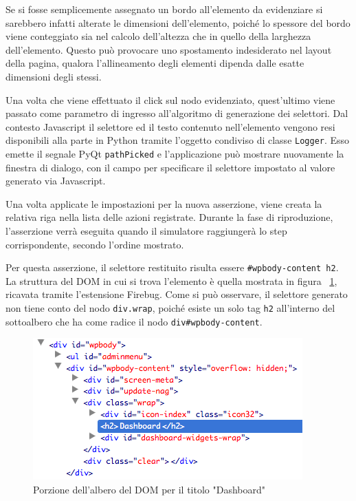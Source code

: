 Se si fosse semplicemente assegnato un bordo all'elemento da evidenziare si sarebbero infatti alterate le dimensioni dell'elemento, poiché lo spessore del bordo viene conteggiato sia nel calcolo dell'altezza che in quello della larghezza dell'elemento. Questo può provocare uno spostamento indesiderato nel layout della pagina, qualora l'allineamento degli elementi dipenda dalle esatte dimensioni degli stessi.

Una volta che viene effettuato il click sul nodo evidenziato, quest'ultimo viene passato come parametro di ingresso all'algoritmo di generazione dei selettori. Dal contesto Javascript il selettore ed il testo contenuto nell'elemento vengono resi disponibili alla parte in Python tramite l'oggetto condiviso di classe \verb|Logger|. Esso emette il segnale PyQt \verb|pathPicked| e l'applicazione può mostrare nuovamente la finestra di dialogo, con il campo per specificare il selettore impostato al valore generato via Javascript.

Una volta applicate le impostazioni per la nuova asserzione, viene creata la relativa riga nella lista delle azioni registrate. Durante la fase di riproduzione, l'asserzione verrà eseguita quando il simulatore raggiungerà lo step corrispondente, secondo l'ordine mostrato.

Per questa asserzione, il selettore restituito risulta essere \verb|#wpbody-content h2|. La struttura del DOM in cui si trova l'elemento è quella mostrata in figura ~\ref{fig:dashboardH2DOM}, ricavata tramite l'estensione Firebug. Come si può osservare, il selettore generato non tiene conto del nodo \verb|div.wrap|, poiché esiste un solo tag \verb|h2| all'interno del sottoalbero che ha come radice il nodo \verb|div#wpbody-content|. 

\begin{figure}[htbp]
\begin{center}
\includegraphics[width=\textwidth]{images/wp_tour/7_dashboard_h2_firebug.png}
\caption{Porzione dell'albero del DOM per il titolo "Dashboard"}
\label{fig:dashboardH2DOM}
\end{center}
\end{figure}

